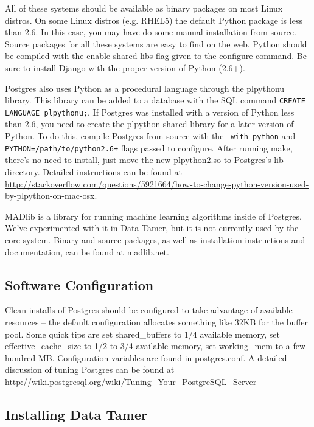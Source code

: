 All of these systems should be available as binary packages on most Linux distros.  On some Linux distros (e.g. RHEL5) the default Python package is less than 2.6.  In this case, you may have do some manual installation from source.  Source packages for all these systems are easy to find on the web.  Python should be compiled with the enable-shared-libs flag given to the configure command.  Be sure to install Django with the proper version of Python (2.6+).

Postgres also uses Python as a procedural language through the plpythonu library.  This library can be added to a database with the SQL command \texttt{CREATE LANGUAGE plpythonu;}.  If Postgres was installed with a version of Python less than 2.6, you need to create the plpython shared library for a later version of Python.  To do this, compile Postgres from source with the \texttt{--with-python} and \texttt{PYTHON=/path/to/python2.6+} flags passed to configure.  After running make, there's no need to install, just move the new plpython2.so to Postgres's lib directory.  Detailed instructions can be found at \url{http://stackoverflow.com/questions/5921664/how-to-change-python-version-used-by-plpython-on-mac-osx}.

MADlib is a library for running machine learning algorithms inside of Postgres.  We've experimented with it in Data Tamer, but it is not currently used by the core system.  Binary and source packages, as well as installation instructions and documentation, can be found at madlib.net.


\subsection{Software Configuration}

Clean installs of Postgres should be configured to take advantage of available resources -- the default configuration allocates something like 32KB for the buffer pool.  Some quick tips are set shared\_buffers to 1/4 available memory, set effective\_cache\_size to 1/2 to 3/4 available memory, set working\_mem to a few hundred MB.  Configuration variables are found in postgres.conf.  A detailed discussion of tuning Postgres can be found at \url{http://wiki.postgresql.org/wiki/Tuning\_Your\_PostgreSQL\_Server}


\subsection{Installing Data Tamer}

